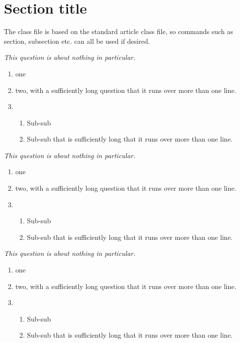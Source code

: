 \documentclass{ouexam}
\begin{document}
\section{Section title}

The class file is based on the standard article class file, so commands such as section, subsection etc. can all be used if desired.


\question
\emph{This question is about nothing in particular.}
\begin{enumerate}
\item one
\item two, with a sufficiently long question that it runs over more than one line.
\item 
\begin{enumerate}
\item Sub-sub
\item Sub-sub that is sufficiently long that it runs over more than one line.
\end{enumerate}
\end{enumerate}



\question
\emph{This question is about nothing in particular.}
\begin{enumerate}
\item one
\item two, with a sufficiently long question that it runs over more than one line.
\item 
\begin{enumerate}
\item Sub-sub
\item Sub-sub that is sufficiently long that it runs over more than one line.
\end{enumerate}
\end{enumerate}



\question
\emph{This question is about nothing in particular.}
\begin{enumerate}
\item one
\item two, with a sufficiently long question that it runs over more than one line.
\item 
\begin{enumerate}
\item Sub-sub
\item Sub-sub that is sufficiently long that it runs over more than one line.
\end{enumerate}
\end{enumerate}
\end{document}
